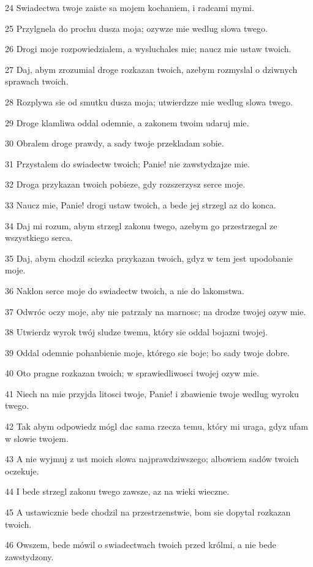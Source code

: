 \par 24 Swiadectwa twoje zaiste sa mojem kochaniem, i radcami mymi.
\par 25 Przylgnela do prochu dusza moja; ozywze mie wedlug slowa twego.
\par 26 Drogi moje rozpowiedzialem, a wysluchales mie; naucz mie ustaw twoich.
\par 27 Daj, abym zrozumial droge rozkazan twoich, azebym rozmyslal o dziwnych sprawach twoich.
\par 28 Rozplywa sie od smutku dusza moja; utwierdzze mie wedlug slowa twego.
\par 29 Droge klamliwa oddal odemnie, a zakonem twoim udaruj mie.
\par 30 Obralem droge prawdy, a sady twoje przekladam sobie.
\par 31 Przystalem do swiadectw twoich; Panie! nie zawstydzajze mie.
\par 32 Droga przykazan twoich pobieze, gdy rozszerzysz serce moje.
\par 33 Naucz mie, Panie! drogi ustaw twoich, a bede jej strzegl az do konca.
\par 34 Daj mi rozum, abym strzegl zakonu twego, azebym go przestrzegal ze wszystkiego serca.
\par 35 Daj, abym chodzil sciezka przykazan twoich, gdyz w tem jest upodobanie moje.
\par 36 Naklon serce moje do swiadectw twoich, a nie do lakomstwa.
\par 37 Odwróc oczy moje, aby nie patrzaly na marnosc; na drodze twojej ozyw mie.
\par 38 Utwierdz wyrok twój sludze twemu, który sie oddal bojazni twojej.
\par 39 Oddal odemnie pohanbienie moje, którego sie boje; bo sady twoje dobre.
\par 40 Oto pragne rozkazan twoich; w sprawiedliwosci twojej ozyw mie.
\par 41 Niech na mie przyjda litosci twoje, Panie! i zbawienie twoje wedlug wyroku twego.
\par 42 Tak abym odpowiedz mógl dac sama rzecza temu, który mi uraga, gdyz ufam w slowie twojem.
\par 43 A nie wyjmuj z ust moich slowa najprawdziwszego; albowiem sadów twoich oczekuje.
\par 44 I bede strzegl zakonu twego zawsze, az na wieki wieczne.
\par 45 A ustawicznie bede chodzil na przestrzenstwie, bom sie dopytal rozkazan twoich.
\par 46 Owszem, bede mówil o swiadectwach twoich przed królmi, a nie bede zawstydzony.
